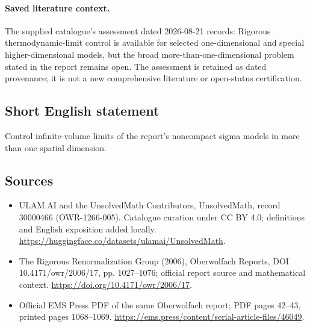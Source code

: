 \documentclass[11pt]{article}
\begin{document}
\paragraph{Saved literature context.} The supplied catalogue's assessment dated 2026-08-21 records: Rigorous thermodynamic-limit control is available for selected one-dimensional and special higher-dimensional models, but the broad more-than-one-dimensional problem stated in the report remains open. The assessment is retained as dated provenance; it is not a new comprehensive literature or open-status certification.
\subsection{Short English statement}
Control infinite-volume limits of the report's noncompact sigma models in more than one spatial dimension.
\subsection{Sources}
\begin{itemize}
\item[\hypertarget{source:30000466:1}{S1}] ULAM.AI and the UnsolvedMath Contributors, UnsolvedMath, record 30000466 (OWR-1266-005). Catalogue curation under CC BY 4.0; definitions and English exposition added locally.
\url{https://huggingface.co/datasets/ulamai/UnsolvedMath}.
\item[\hypertarget{source:30000466:2}{S2}] The Rigorous Renormalization Group (2006), Oberwolfach Reports, DOI 10.4171/owr/2006/17, pp. 1027--1076; official report source and mathematical context.
\url{https://doi.org/10.4171/owr/2006/17}.
\item[\hypertarget{source:30000466:3}{S3}] Official EMS Press PDF of the same Oberwolfach report; PDF pages 42--43, printed pages 1068--1069.
\url{https://ems.press/content/serial-article-files/46049}.
\end{itemize}
\label{end:30000466}
\end{document}
